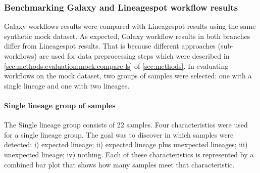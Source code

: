         \subsubsection{Benchmarking Galaxy and Lineagespot workflow results}
        Galaxy workflows results were compared with Lineagespot results using the same synthetic mock dataset. As expected, Galaxy workflow results in both branches differ from Lineagespot results. That is because different approaches (sub-workflows) are used for data preprocessing steps which were described in \autoref{sec:methods:evaluation:mock:compare-ls} of \cref{sec:methods}. In evaluating workflows on the mock dataset, two groups of samples were selected: one with a single lineage and one with two lineages.
            \paragraph{Single lineage group of samples}
            The Single lineage group consists of 22 samples. Four characteristics were used for a single lineage group. The goal was to discover in which samples were detected: i) expected lineage; ii) expected lineage plus unexpected lineages; iii) unexpected lineage; iv) nothing. Each of these characteristics is represented by a combined bar plot that shows how many samples meet that characteristic.
                

